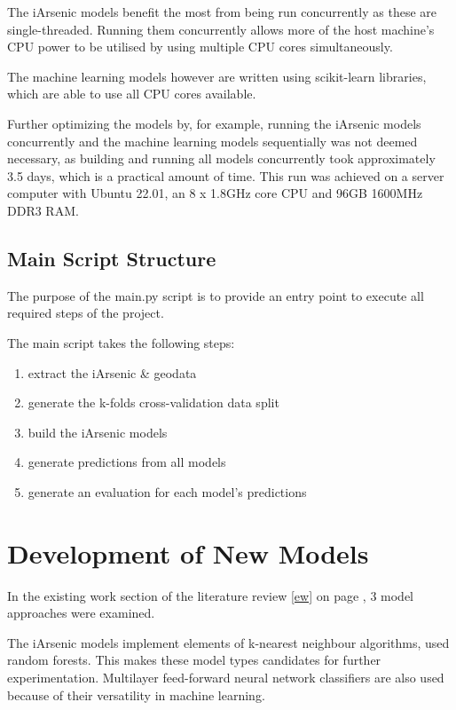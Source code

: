 The iArsenic models benefit the most from being run concurrently as these are single-threaded. Running them concurrently allows more of the host machine's CPU power to be utilised by using multiple CPU cores simultaneously.

The machine learning models however are written using scikit-learn libraries, which are able to use all CPU cores available. 

Further optimizing the models by, for example, running the iArsenic models concurrently and the machine learning models sequentially was not deemed necessary, as building and running all models concurrently took approximately 3.5 days, which is a practical amount of time. This run was achieved on a server computer with Ubuntu 22.01, an 8 x 1.8GHz core CPU and 96GB 1600MHz DDR3 RAM.

\subsection{Main Script Structure}

The purpose of the main.py script is to provide an entry point to execute all required steps of the project.

The main script takes the following steps:
\begin{enumerate}
    \item extract the iArsenic \& geodata
    \item generate the k-folds cross-validation data split 
    \item build the iArsenic models
    \item generate predictions from all models
    \item generate an evaluation for each model's predictions
\end{enumerate}

\section{Development of New Models}

In the existing work section of the literature review \ref{ew} on page \pageref{ew}, 3 model approaches were examined.

The iArsenic models implement elements of k-nearest neighbour algorithms, \cite{Winkel2008} used random forests. This makes these model types candidates for further experimentation. Multilayer feed-forward neural network classifiers are also used because of their versatility in machine learning.

